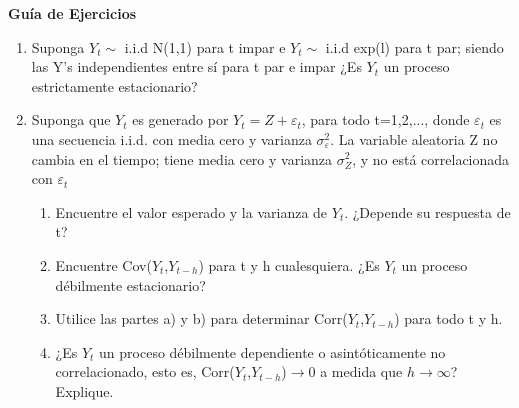 \documentclass[12pt,letterpaper]{article}
\begin{document}
\begin{center}
\large\textbf{Gu\'ia de Ejercicios}
\end{center}
\begin{enumerate}
\item Suponga $Y_{t}\sim$  i.i.d N(1,1) para t impar e $Y_{t}\sim$ i.i.d exp(l) para t par; siendo las Y's independientes entre sí para t par e impar ¿Es $Y_{t}$ un proceso estrictamente estacionario?

\item Suponga que $Y_{t}$ es generado por $Y_{t}=Z+\varepsilon_{t}$, para todo t=1,2,..., donde $\varepsilon_{t}$ es una secuencia i.i.d. con media cero y varianza $\sigma_{\varepsilon}^{2}$. La variable aleatoria Z no cambia en el tiempo; tiene media cero y varianza $\sigma_{Z}^{2}$, y no está correlacionada con $\varepsilon_{t}$
    \begin{enumerate}
        \item Encuentre el valor esperado y la varianza de $Y_{t}$. ¿Depende su respuesta de t?
        \item Encuentre Cov($Y_{t}$,$Y_{t-h}$) para t y h cualesquiera. ¿Es $Y_{t}$ un proceso débilmente estacionario?
        \item Utilice las partes a) y b) para determinar Corr($Y_{t}$,$Y_{t-h}$) para todo t y h.
        \item ¿Es $Y_{t}$ un proceso débilmente dependiente o asintóticamente no correlacionado, esto es, Corr($Y_{t}$,$Y_{t-h}$)$\rightarrow 0$ a medida que $h\rightarrow \infty$? Explique.
    \end{enumerate}




\end{enumerate}
\end{document}
